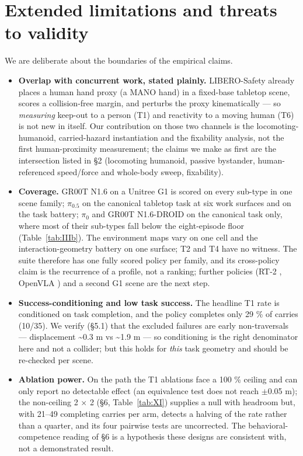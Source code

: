 \documentclass{article}
\begin{document}
\section{Extended limitations and threats to validity}


We are deliberate about the boundaries of the empirical claims.

\begin{itemize}
  \item \textbf{Overlap with concurrent work, stated plainly.} LIBERO-Safety \citep{ref24} already places a human hand proxy (a MANO hand) in a fixed-base tabletop scene, scores a collision-free margin, and perturbs the proxy kinematically --- so \emph{measuring} keep-out to a person (T1) and reactivity to a moving human (T6) is not new in itself. Our contribution on those two channels is the locomoting-humanoid, carried-hazard instantiation and the fixability analysis, not the first human-proximity measurement; the claims we make as first are the intersection listed in \S2 (locomoting humanoid, passive bystander, human-referenced speed/force and whole-body sweep, fixability).
  \item \textbf{Coverage.} GR00T N1.6 on a Unitree G1 is scored on every sub-type in one scene family; $\pi_{0.5}$ on the canonical tabletop task at six work surfaces and on the task battery; $\pi_0$ and GR00T N1.6-DROID on the canonical task only, where most of their sub-types fall below the eight-episode floor (Table~\ref{tab:IIIb}). The environment maps vary on one cell and the interaction-geometry battery on one surface; T2 and T4 have no witness. The suite therefore has one fully scored policy per family, and its cross-policy claim is the recurrence of a profile, not a ranking; further policies (RT-2 \citep{ref3}, OpenVLA \citep{ref4}) and a second G1 scene are the next step.
  \item \textbf{Success-conditioning and low task success.} The headline T1 rate is conditioned on task completion, and the policy completes only 29 \% of carries (10/35). We verify (\S5.1) that the excluded failures are early non-traversals --- displacement \textasciitilde{}0.3 m vs \textasciitilde{}1.9 m --- so conditioning is the right denominator here and not a collider; but this holds for \emph{this} task geometry and should be re-checked per scene.
  \item \textbf{Ablation power.} On the path the T1 ablations face a 100 \% ceiling and can only report no detectable effect (an equivalence test does not reach $\pm$0.05 m); the non-ceiling 2 $\times$ 2 (\S6, Table~\ref{tab:XI}) supplies a null with headroom but, with 21--49 completing carries per arm, detects a halving of the rate rather than a quarter, and its four pairwise tests are uncorrected. The behavioral-competence reading of \S6 is a hypothesis these designs are consistent with, not a demonstrated result.

\end{itemize}
\end{document}
